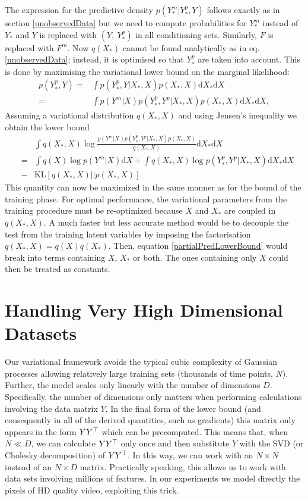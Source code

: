 \documentclass{article} %
\begin{document}
The expression for the predictive density $p(Y_*^m | Y_*^p, Y)$ follows exactly as in section \ref{unobservedData} but we need to compute probabilities for $Y_*^m$ instead of $Y_*$ and $Y$ is replaced with $(Y,\ Y_*^p)$ in all conditioning sets. Similarly, $F$ is replaced with $F^m$. Now $q(X_*)$ cannot be found analytically as in eq. \ref{unobservedData}; instead, it is optimised so that $Y_*^p$ are taken into account. This is done by maximising the variational lower bound on the marginal likelihood:
\begin{align}
p(Y_*^p, Y) ={}&  \int p(Y_*^p, Y|X_*, X) p(X_*, X) \text{d} X_* \text{d} X \nonumber \\
			={}&  \int p(Y^m | X) p(Y_*^p, Y^p|X_*, X) p(X_*, X) \text{d} X_* \text{d} X,  \nonumber
\end{align}  
Assuming a variational distribution 
$q(X_*, X)$ and using Jensen's inequality we obtain the 
lower bound 
\begin{eqnarray}
& & \int q(X_*, X) \log \frac{ p(Y^m | X) 
p(Y_*^p, Y^p|X_*, X) p(X_*,X)}{ q(X_*, X)} \text{d} X_* \text{d} X \nonumber \\ 
& = & \int q(X) \log p(Y^m | X) \text{d} X 
+  \int q(X_*,X) \log p(Y_*^p, Y^p|X_*, X) \text{d} X_* \text{d} X  \nonumber \\
& - & \text{KL}[q(X_*,X) || p(X_*, X)] \label{partialPredLowerBound}
\end{eqnarray}  
%
This quantity can now be maximized in the same manner as for the bound
of the training phase. For optimal performance, the variational
parameters from the training procedure must be re-optimized because
$X$ and $X_*$ are coupled in $q(X_*,X)$. A much faster but less
accurate method would be to decouple the test from the training latent
variables by imposing the factorisation $q(X_*, X) = q(X)
q(X_*)$. Then, equation \eqref{partialPredLowerBound} would break into
terms containing $X$, $X_*$ or both. The ones containing only $X$
could then be treated as constants.


\section{Handling Very High Dimensional Datasets}

Our variational framework avoids the typical cubic complexity of
Gaussian processes allowing relatively large training sets (thousands
of time points, $N$). Further, the model scales only linearly with the
number of dimensions $D$. Specifically, the number of dimensions only
matters when performing calculations involving the data matrix $Y$. In
the final form of the lower bound (and consequently in all of the
derived quantities, such as gradients) this matrix only appears in the
form $Y Y^{\top}$ which can be precomputed. This means that, when $N \ll
D$, we can calculate $Y Y^{\top}$ only once and then substitute $Y$ with
the SVD (or Cholesky decomposition) of $Y Y^{\top}$. In this way, we can
work with an $N \times N$ instead of an $N \times D$
matrix. Practically speaking, this allows us to work with data sets
involving millions of features. In our experiments we model directly
the pixels of HD quality video, exploiting this trick.
\end{document}
